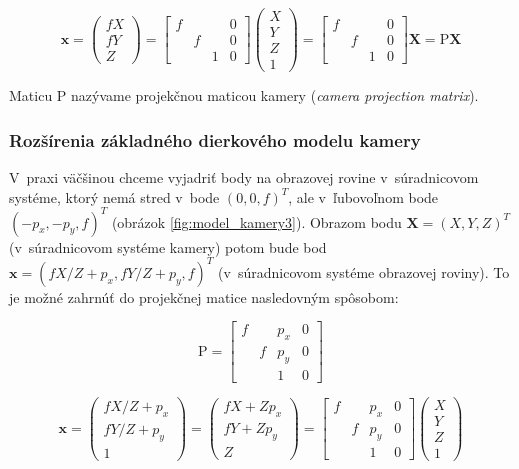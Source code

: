 $$ \mathbf{x} 
=
\begin{pmatrix}
fX \\
fY \\
Z
\end{pmatrix}
=
\begin{bmatrix}
f &   &   & 0 \\
  & f &   & 0 \\
  &   & 1 & 0
\end{bmatrix}
\begin{pmatrix}
X \\
Y \\
Z \\
1
\end{pmatrix}
=
\begin{bmatrix}
f &   &   & 0 \\
  & f &   & 0 \\
  &   & 1 & 0
\end{bmatrix}
\mathbf{X}
=
\mathrm{P} \mathbf{X}
$$

Maticu $\mathrm{P}$ nazývame projekčnou maticou kamery (\emph{camera projection matrix}).

\subsubsection{Rozšírenia základného dierkového modelu kamery}

V~praxi väčšinou chceme vyjadriť body na obrazovej rovine v~súradnicovom systéme, ktorý nemá stred v~bode $(0, 0, f)^T$, ale v~ľubovoľnom bode $(-p_x, -p_y, f)^T$ (obrázok \ref{fig:model_kamery3}). Obrazom bodu $\mathbf{X} = (X, Y, Z)^T$ (v~súradnicovom systéme kamery) potom bude bod $\mathbf{x} = (fX/Z + p_x, fY/Z + p_y, f)^T$ (v~súradnicovom systéme obrazovej roviny). To je možné zahrnúť do projekčnej matice nasledovným spôsobom:

$$ \mathrm{P} =
\begin{bmatrix}
f &   & p_x & 0 \\
  & f & p_y & 0 \\
  &   &  1  & 0
\end{bmatrix}
$$

$$ \mathbf{x} 
=
\begin{pmatrix}
fX/Z + p_x \\
fY/Z + p_y \\
1
\end{pmatrix}
=
\begin{pmatrix}
fX + Z p_x \\
fY + Z p_y \\
Z
\end{pmatrix}
=
\begin{bmatrix}
f &   &  p_x & 0 \\
  & f &  p_y & 0 \\
  &   &   1  & 0
\end{bmatrix}
\begin{pmatrix}
X \\
Y \\
Z \\
1
\end{pmatrix}
$$

